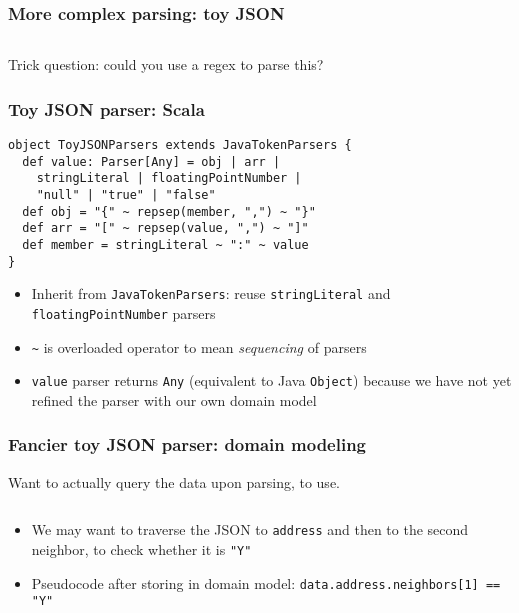 
\begin{frame}[fragile]
  \frametitle{More complex parsing: toy JSON}

  \inputminted{json}{javascript/example.json}

  Trick question: could you use a regex to parse this?
\end{frame}



\begin{frame}[fragile]
  \frametitle{Toy JSON parser: Scala}

  \begin{verbatim}
object ToyJSONParsers extends JavaTokenParsers {
  def value: Parser[Any] = obj | arr |
    stringLiteral | floatingPointNumber |
    "null" | "true" | "false"
  def obj = "{" ~ repsep(member, ",") ~ "}"
  def arr = "[" ~ repsep(value, ",") ~ "]"
  def member = stringLiteral ~ ":" ~ value
}
  \end{verbatim}

  \begin{itemize}
    \item Inherit from \texttt{JavaTokenParsers}: reuse \texttt{stringLiteral} and \texttt{floatingPointNumber} parsers
    \item \texttt{\~} is overloaded operator to mean \emph{sequencing} of parsers
    \item \texttt{value} parser returns \texttt{Any} (equivalent to Java \texttt{Object}) because we have not yet refined the parser with our own domain model
  \end{itemize}
\end{frame}

\begin{frame}[fragile]
  \frametitle{Fancier toy JSON parser: domain modeling}

  Want to actually query the data upon parsing, to use.

  \inputminted{json}{javascript/example.json}
  
  \begin{itemize}
    \item We may want to traverse the JSON to \texttt{address} and then to the second neighbor, to check whether it is \texttt{"Y"}
    \item Pseudocode after storing in domain model: \texttt{data.address.neighbors[1] == "Y"}
  \end{itemize}
\end{frame}

